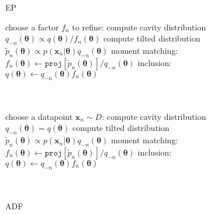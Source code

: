 \begin{figure}[!t]
\begin{minipage}[t]{0.33\linewidth}
\centering
\begin{algorithm}[H] 
\caption{EP} \small
\label{alg:ep} 
\begin{algorithmic}[1] 
	\STATE choose a factor $f_n$ to refine:
	\STATE compute cavity distribution \\$q_{-n}(\bm{\theta}) \propto q(\bm{\theta}) / f_n(\bm{\theta})$ 
	\STATE compute tilted distribution \\$\tilde{p}_n(\bm{\theta}) \propto p(\bm{x}_n|\bm{\theta}) q_{-n}(\bm{\theta})$
	\STATE moment matching: \\ \hspace{-1mm}$f_n(\bm{\theta}) \leftarrow \mathtt{proj}[\tilde{p}_n(\bm{\theta})] / q_{-n}(\bm{\theta}) $
	\STATE inclusion:\\ $q(\bm{\theta}) \leftarrow q_{-n}(\bm{\theta}) f_n(\bm{\theta})$\\\hspace{1mm}\\ \vspace{1.5mm} \hspace{1mm}\\
\end{algorithmic}
\end{algorithm}
\end{minipage}
%
\begin{minipage}[t]{0.33\linewidth}
\centering
\begin{algorithm}[H] 
\caption{ADF} \small
\label{alg:ep} 
\begin{algorithmic}[1] 
	\STATE choose a datapoint $\bm{x}_n\sim D$:
	\STATE compute cavity distribution \\$q_{-n}(\bm{\theta}) = q(\bm{\theta})$
	\STATE compute tilted distribution \\$\tilde{p}_n(\bm{\theta}) \propto p(\bm{x}_n|\bm{\theta}) q_{-n}(\bm{\theta})$
	\STATE moment matching: \\ \hspace{-1mm}$f_n(\bm{\theta}) \leftarrow \mathtt{proj}[\tilde{p}_n(\bm{\theta})] / q_{-n}(\bm{\theta}) $
	\STATE inclusion:\\ $q(\bm{\theta}) \leftarrow q_{-n}(\bm{\theta}) f_n(\bm{\theta})$\\\hspace{1mm}\\ \vspace{1.5mm} \hspace{1mm}\\

\end{algorithmic}
\end{algorithm}
\end{minipage}
\end{figure}
